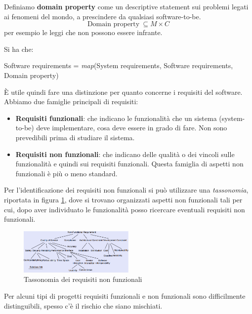 \begin{definizione}
      Definiamo \textbf{domain property} come un descriptive statement sui problemi
      legati ai fenomeni del mondo, a prescindere da qualsiasi software-to-be.
      \begin{equation}
            \text{Domain property} \ \subseteq M \times C
      \end{equation}
      per esempio le leggi che non possono essere infrante.
\end{definizione}
Si ha che:
\begin{center}
      Software requirements = \textit{map}(System requirements, Software
      requirements, Domain property)
\end{center}
È utile quindi fare una distinzione per quanto concerne i requisiti del software.
Abbiamo due famiglie principali di requisiti:
\begin{itemize}
      \item \textbf{Requisiti funzionali}: che indicano le funzionalità che un
            sistema (system-to-be) deve implementare, cosa deve essere in grado
            di fare. Non sono prevedibili prima di studiare il sistema.
      \item \textbf{Requisiti non funzionali}: che indicano delle qualità o dei
            vincoli sulle funzionalità e quindi sui requisiti funzionali. Questa
            famiglia di aspetti non funzionali è più o meno standard.
\end{itemize}
Per l'identificazione dei requisiti non funzionali si può utilizzare una
\textit{tassonomia}, riportata in figura \ref{fig:tasso}, dove si trovano
organizzati aspetti non funzionali tali per cui, dopo aver individuato le
funzionalità posso ricercare eventuali requisiti non funzionali.
\begin{figure}[!ht]
      \centering
      \includegraphics[width=0.5\textwidth]{img/requirements/tassonomia.png}
      \caption{Tassonomia dei requisiti non funzionali}
      \label{fig:tasso}
\end{figure}
Per alcuni tipi di progetti requisiti funzionali e non funzionali sono
difficilmente distinguibili, spesso c'è il rischio che siano mischiati.

